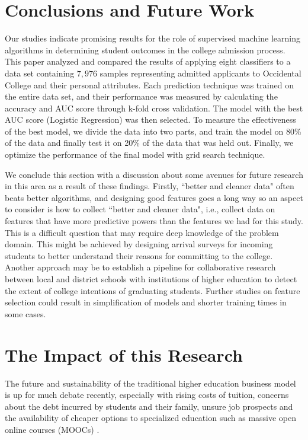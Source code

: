 \documentclass[11pt, oneside]{article}   	%
\begin{document}
\section{Conclusions and Future Work}
\label{sec:conclusions and future work}
Our studies indicate promising results for the role of supervised machine learning algorithms in determining student outcomes in the college admission process. This paper analyzed and compared the results of applying eight classifiers to a data set containing $7,976$ samples representing 
admitted applicants to Occidental College and their personal attributes. Each prediction technique was trained on the entire data set,
and their performance was measured by calculating the accuracy and AUC score through k-fold cross validation. The model with the best AUC score (Logistic Regression) was then selected. To measure the effectiveness of the best model, we divide the data into two parts, and train the model on 80\% of the data and finally test it on 20\% of the data that was held out. Finally, we optimize the performance of the final model with grid search technique.  

We conclude this section with a discussion about some avenues for future research in this area as a result of these findings. 
Firstly, ``better and cleaner data" often beats better algorithms, and designing good features goes a long way so an aspect to consider is how to
collect ``better and cleaner data", i.e., collect data on features that have more predictive powers than the features we had for this study. This is a difficult question that may require deep knowledge of the problem domain.
This might be achieved by designing arrival surveys for incoming students to better understand their reasons for committing to
the college. Another approach may be to establish a pipeline for collaborative research between local and district schools with institutions of higher education to detect the extent of college intentions of graduating students. Further studies on feature selection could result in simplification of models and shorter training times in some cases.

\section{The Impact of this Research}
The future and sustainability of the traditional higher education business model is up for much debate recently, especially with rising costs of tuition, concerns about the debt incurred by students and their family, unsure job prospects and the availability of cheaper options to specialized education such as massive open online courses (MOOCs) \cite{tiaacref}.
\end{document}

